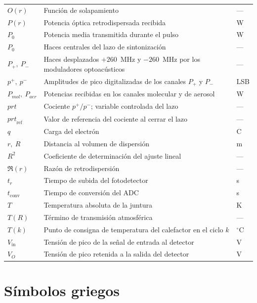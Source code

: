 \begin{longtable}{@{}p{}p{}p{}@{}}
$O(r)$ & Función de solapamiento & --- \\
$P(r)$ & Potencia óptica retrodispersada recibida & W \\
$P_0$ & Potencia media transmitida durante el pulso & W \\
$P_0$ & Haces centrales del lazo de sintonización & --- \\
$P_+,\ P_-$ & Haces desplazados $+260$~MHz y $-260$~MHz por los moduladores optoacústicos & --- \\
$p^{+},\ p^{-}$ & Amplitudes de pico digitalizadas de los canales $P_+$ y $P_-$ & LSB \\
$P_{mol},\ P_{aer}$ & Potencias recibidas en los canales molecular y de aerosol & W \\
$\mathit{prt}$ & Cociente $p^{+}/p^{-}$; variable controlada del lazo & --- \\
$\mathit{prt}_{\mathrm{ref}}$ & Valor de referencia del cociente al cerrar el lazo & --- \\
$q$ & Carga del electrón & C \\
$r,\ R$ & Distancia al volumen de dispersión & m \\
$R^2$ & Coeficiente de determinación del ajuste lineal & --- \\
$\Re(r)$ & Razón de retrodispersión & --- \\
$t_r$ & Tiempo de subida del fotodetector & s \\
$t_{\mathrm{conv}}$ & Tiempo de conversión del ADC & s \\
$T$ & Temperatura absoluta de la juntura & K \\
$T(R)$ & Término de transmisión atmosférica & --- \\
$T(k)$ & Punto de consigna de temperatura del calefactor en el ciclo $k$ & $^{\circ}$C \\
$V_{\text{in}}$ & Tensión de pico de la señal de entrada al detector & V \\
$V_O$ & Tensión de pico retenida a la salida del detector & V \\
\end{longtable}

\section*{Símbolos griegos}


